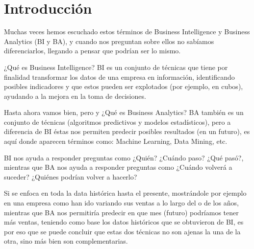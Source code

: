 \section{Introducción} 
\vspace{12mm} %
Muchas veces hemos escuchado estos términos de Business Intelligence y Business Analytics (BI y BA), y cuando nos preguntan sobre ellos no sabíamos diferenciarlos, llegando a pensar que podrían ser lo mismo.\newline

¿Qué es Business Intelligence? BI es un conjunto de técnicas que tiene por finalidad transformar los datos de una empresa en información, identificando posibles indicadores y que estos pueden ser explotados (por ejemplo, en cubos), ayudando a la mejora en la toma de decisiones.\newline

Hasta ahora vamos bien, pero y ¿Qué es Business Analytics? BA también es un conjunto de técnicas (algoritmos predictivos y modelos estadísticos), pero a diferencia de BI éstas nos permiten predecir posibles resultados (en un futuro), es aquí donde aparecen términos como: Machine Learning, Data Mining, etc.\newline

BI nos ayuda a responder preguntas como ¿Quién? ¿Cuándo paso? ¿Qué pasó?, mientras que BA nos ayuda a responder preguntas como ¿Cuándo volverá a suceder?  ¿Quiénes podrían volver a hacerlo?\newline

Si se enfoca en toda la data histórica hasta el presente, mostrándole por ejemplo en una empresa como han ido variando sus ventas a lo largo del o de los años, mientras que BA nos permitiría predecir en que mes (futuro) podríamos tener más ventas, teniendo como base los datos históricos que se obtuvieron de BI, es por eso que se puede concluir que estas dos técnicas no son ajenas la una de la otra, sino más bien son complementarias.\newline
\vspace{16mm} %